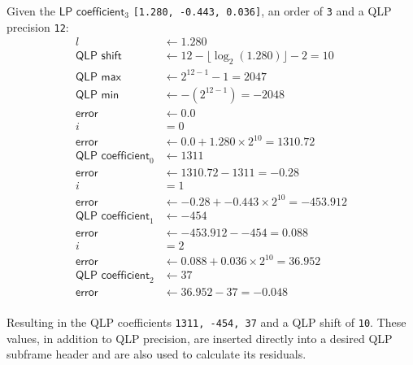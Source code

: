 Given the $\textsf{LP coefficient}_3$ \texttt{[1.280, -0.443, 0.036]},
an \textsf{order} of \texttt{3} and a \textsf{QLP precision} \texttt{12}:
\begin{align*}
l &\leftarrow 1.280 \\
\textsf{QLP shift} &\leftarrow 12 - \lfloor \log_2(1.280) \rfloor - 2 = 10 \\
\textsf{QLP max} &\leftarrow 2 ^ {12 - 1} - 1 = 2047 \\
\textsf{QLP min} &\leftarrow -(2 ^ {12 - 1}) = -2048 \\
\textsf{error} &\leftarrow 0.0 \\
i &= 0 \\
\textsf{error} &\leftarrow 0.0 + 1.280 \times 2 ^ {10} = 1310.72 \\
\textsf{QLP coefficient}_0 &\leftarrow 1311 \\
\textsf{error} &\leftarrow 1310.72 - 1311 = -0.28 \\
i &= 1 \\
\textsf{error} &\leftarrow -0.28 + -0.443 \times 2 ^ {10} = -453.912 \\
\textsf{QLP coefficient}_1 &\leftarrow -454 \\
\textsf{error} &\leftarrow -453.912 - -454 = 0.088 \\
i &= 2 \\
\textsf{error} &\leftarrow 0.088 + 0.036 \times 2 ^ {10} = 36.952 \\
\textsf{QLP coefficient}_2 &\leftarrow 37 \\
\textsf{error} &\leftarrow 36.952 - 37 = -0.048 \\
\end{align*}
\par
\noindent
Resulting in the QLP coefficients \texttt{1311, -454, 37}
and a QLP shift of \texttt{10}.
These values, in addition to QLP precision,
are inserted directly into a desired QLP subframe header
and are also used to calculate its residuals.

\clearpage

